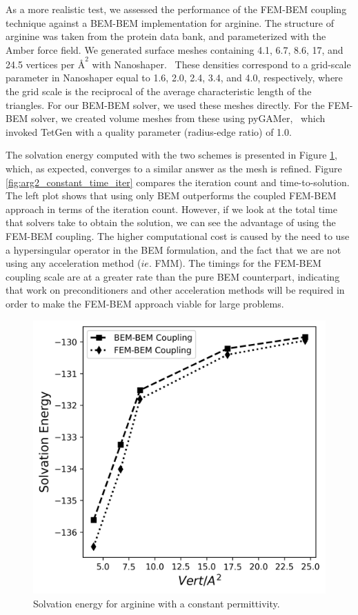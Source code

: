 As a more realistic test, we assessed the performance of the FEM-BEM coupling technique against a BEM-BEM implementation for arginine.
The structure of arginine was taken from the protein data bank, and parameterized with the Amber\cite{ponder2003force} force field. 
We generated surface meshes containing 4.1, 6.7, 8.6, 17, and 24.5 vertices per $\text{\AA}^2$ with Nanoshaper.~\cite{decherchi2013general}
These densities correspond to a grid-scale parameter in Nanoshaper equal to 1.6, 2.0, 2.4, 3.4, and 4.0, respectively, where the grid scale is the reciprocal of the average characteristic length of the triangles.
For our BEM-BEM solver, we used these meshes directly. For the FEM-BEM solver, we created volume meshes from these using pyGAMer,~\cite{lee2020open} which invoked TetGen\cite{hang2015tetgen} with a quality parameter (radius-edge ratio) of 1.0.

The solvation energy computed with the two schemes is presented in Figure \ref{fig:arg_constant_energy}, which, as expected, converges to a similar answer as the mesh is refined.
Figure \ref{fig:arg2_constant_time_iter} compares the iteration count and time-to-solution. The left plot shows that using only BEM outperforms the coupled FEM-BEM approach in terms of the iteration count. However, if we look at the total time that solvers take to obtain the solution, we can see the advantage of using the FEM-BEM coupling. The higher computational cost is caused by the need to use a hypersingular operator in the BEM formulation, and the fact that we are not using any acceleration method ($ie.$ FMM).
The timings for the FEM-BEM coupling scale are at a greater rate than the pure BEM counterpart, indicating that work on preconditioners and other acceleration methods will be required in order to make
the FEM-BEM approach viable for large problems.


\begin{figure}
\centering
   \includegraphics[width=0.45\linewidth]{DolfinX_Arginine2_const_coeff_error.png}
\caption{Solvation energy for arginine with a constant permittivity.}
\label{fig:arg_constant_energy}
\end{figure}

